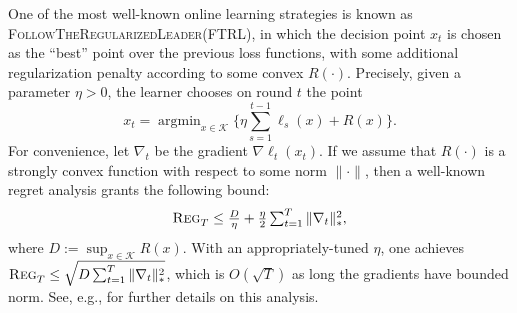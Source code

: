 \documentclass[final,12pt]{colt2018} %
\def\K{\mathcal{K}}
\def\argmin{\mathop{\arg\min}}
\def\FTRL{\textsc{FollowTheRegularizedLeader}\xspace}
\newcommand{\uregret}[1]{\textsc{Reg}^{#1}_T}
\begin{document}
One of the most well-known online learning strategies is known as \FTRL (FTRL), in which the decision point $x_t$ is chosen as the ``best'' point over the previous loss functions, with some additional regularization penalty according to some convex $R(\cdot)$. Precisely, given a parameter $\eta > 0$, the learner chooses on round $t$ the point
\begin{equation}\label{eq:FTRL}
\textstyle    x_t = \argmin_{x \in \K} \{ \eta \textstyle \sum_{s=1}^{t-1} \ell_s(x) + R(x) \}.
\end{equation}
For convenience, let $\nabla_t$ be the gradient $\nabla \ell_t(x_t)$. If we assume that $R(\cdot)$ is a strongly convex function with respect to some norm $\| \cdot \|$, then a well-known 
regret analysis grants the following bound:
\begin{equation}\label{eq:FTRLbound}
  \textstyle \uregret{} \leq \frac D \eta +  \frac \eta 2 \sum_{t=1}^T \| \nabla_t \|_*^2,
\end{equation}
where $D := \sup_{x \in \K} R(x)$. With an appropriately-tuned $\eta$, one achieves $\uregret{} \leq \sqrt{D\sum_{t=1}^T \| \nabla_t\|_*^2}$, which is $O(\sqrt{T})$ as long the gradients have bounded norm. See, e.g., \cite{shalev2012online,H14,RS16} for further details on this analysis.
\end{document}
